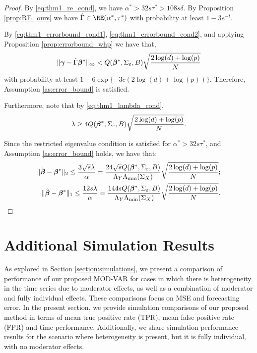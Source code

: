 \begin{proof}
    By \eqref{eq:thm1_re_cond}, we have $\alpha^* > 32s \tau^* > 108s\delta$. By Proposition \ref{prop:RE_ours} we have $\hat\Gamma \in\RE(\alpha^*,\tau^*)$ with probability at least $1 - 3e^{-t}$. 

    By \eqref{eq:thm1_errorbound_cond1}, \eqref{eq:thm1_errorbound_cond2}, and applying Proposition \ref{prop:errorbound_whp} we have that,
    $$  \|\bm{\gamma} - \hat\Gamma \bm{\beta}^*\|_\infty  < Q(\bm{\beta}^*, \Sigma_\varepsilon, B)\sqrt{\frac{2\log(d) + \log(p)}{N}} $$
    with probability at least $1 - 6\exp\{ -3c (2\log(d) + \log(p)) \}$. Therefore, Assumption \ref{as:error_bound} is satisfied.

    Furthermore, note that by \eqref{eq:thm1_lambda_cond}, $$ \lambda \geq 4Q(\bm{\beta}^*, \Sigma_\varepsilon, B) \sqrt{\frac{2\log(d) + \log(p)}{N}}.$$

    Since the restricted eigenvalue condition is satisfied for $\alpha^* > 32 s \tau^*$, and Assumption \ref{as:error_bound} holds, we have that:
        \begin{align*}
        \|\hat{\bm{\beta}} - \bm{\beta}^* \|_2  \leq\frac{3\sqrt{s}\lambda}{\alpha}  =  \frac{24\sqrt{s} Q(\bm{\beta}^*, \Sigma_\varepsilon, B)}{\Lambda_{Y} \Lambda_{\min}(\Sigma_X)}  \sqrt{\frac{2\log(d) + \log(p)}{N}};\\
        \| \hat{\bm{\beta}} - \bm{\beta}^*\|_1 \leq \frac{12s \lambda}{\alpha} =  \frac{144 s Q(\bm{\beta}^*, \Sigma_\varepsilon, B)}{\Lambda_{Y} \Lambda_{\min}(\Sigma_X)}  \sqrt{\frac{2\log(d) + \log(p)}{N}}.
    \end{align*}
\end{proof}





\section{Additional Simulation Results}\label{supmat_section:add_sims}

As explored in Section \ref{section:simulations}, we present a comparison of performance of our proposed MOD-VAR for cases in which there is heterogeneity in the time series due to moderator effects, as well as a combination of moderator and fully individual effects. These comparisons focus on MSE and forecasting error. In the present section, we provide simulation comparisons of our proposed method in terms of mean true positive rate (TPR), mean false positive rate (FPR) and time performance. Additionally, we share simulation performance results for the scenario where heterogeneity is present, but it is fully individual, with no moderator effects.

